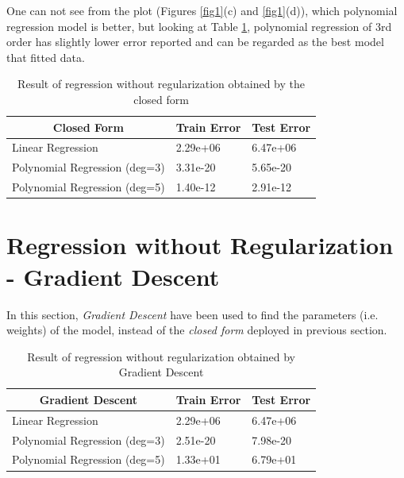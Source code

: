 \documentclass[paper=a4, fontsize=11pt]{scrartcl} %
\numberwithin{figure}{section} %
\numberwithin{table}{section} %
\begin{document}
One can not see from the plot (Figures \ref{fig1}(c) and \ref{fig1}(d)), which polynomial regression model is better, but looking at Table \ref{tab1}, polynomial regression of 3rd order has slightly lower error reported and can be regarded as the best model that fitted data.

\begin{table}[]
\centering
\caption{Result of regression without regularization obtained by the closed form}
\label{tab1}
\begin{tabular}{|l|l|l|}
\hline
\multicolumn{1}{|c|}{\textbf{Closed Form}} & \textbf{Train Error} & \textbf{Test Error} \\ \hline
Linear Regression             & 2.29e+06             & 6.47e+06            \\ \hline
Polynomial Regression (deg=3) & 3.31e-20             & 5.65e-20            \\ \hline
Polynomial Regression (deg=5) & 1.40e-12             & 2.91e-12            \\ \hline
\end{tabular}
\end{table}

\section{Regression without Regularization - Gradient Descent}
In this section, \textit{Gradient Descent} have been used to find the parameters (i.e. weights) of the model, instead of the \textit{closed form} deployed in previous section.

\begin{table}[]
\centering
\caption{Result of regression without regularization obtained by Gradient Descent}
\label{tab2}
\begin{tabular}{|l|l|l|}
\hline
\multicolumn{1}{|c|}{\textbf{Gradient Descent}} & \textbf{Train Error} & \textbf{Test Error} \\ \hline
Linear Regression                               & 2.29e+06             & 6.47e+06            \\ \hline
Polynomial Regression (deg=3)                   & 2.51e-20             & 7.98e-20            \\ \hline
Polynomial Regression (deg=5)                   & 1.33e+01             & 6.79e+01            \\ \hline
\end{tabular}
\end{table}
\end{document}
